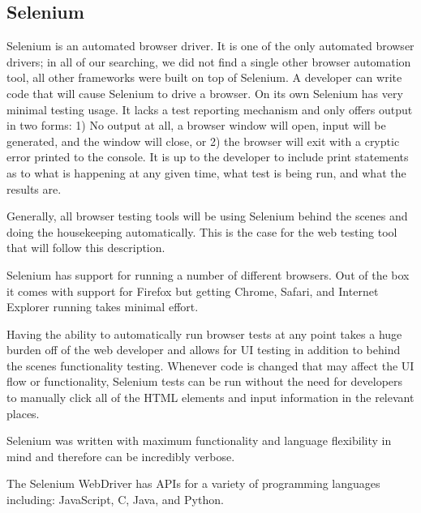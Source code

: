 \documentclass[12pt]{ucthesis}
\begin{document}
\subsection{Selenium}
Selenium\cite{Selenium} is an automated browser driver. It is one of the only automated browser drivers; in all of our searching, we did not find a single other browser automation tool, all other frameworks were built on top of Selenium. A developer can write code that will cause Selenium to drive a browser. On its own Selenium has very minimal testing usage. It lacks a test reporting mechanism and only offers output in two forms: 1) No output at all, a browser window will open, input will be generated, and the window will close, or 2) the browser will exit with a cryptic error printed to the console. It is up to the developer to include print statements as to what is happening at any given time, what test is being run, and what the results are.

Generally, all browser testing tools will be using Selenium behind the scenes and doing the housekeeping automatically. This is the case for the web testing tool that will follow this description.

Selenium has support for running a number of different browsers. Out of the box it comes with support for Firefox but getting Chrome, Safari, and Internet Explorer running takes minimal effort.

Having the ability to automatically run browser tests at any point takes a huge burden off of the web developer and allows for UI testing in addition to behind the scenes functionality testing. Whenever code is changed that may affect the UI flow or functionality, Selenium tests can be run without the need for developers to manually click all of the HTML elements and input information in the relevant places.


Selenium was written with maximum functionality and language flexibility in mind and therefore can be incredibly verbose.

The Selenium WebDriver has APIs for a variety of programming languages including: JavaScript, C, Java, and Python.
\end{document}

